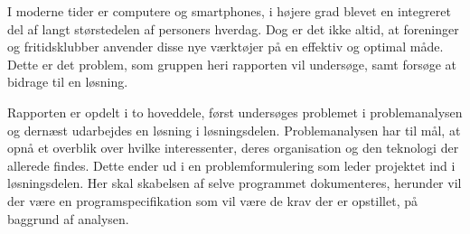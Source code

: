I moderne tider er computere og smartphones, i højere grad blevet en integreret del af langt størstedelen af personers hverdag. 
Dog er det ikke altid, at foreninger og fritidsklubber anvender disse nye værktøjer på en effektiv og optimal måde. 
Dette er det problem, som gruppen heri rapporten vil undersøge, samt forsøge at bidrage til en løsning. 

Rapporten er opdelt i to hoveddele, først undersøges problemet i problemanalysen og dernæst udarbejdes en løsning i løsningsdelen. 
Problemanalysen har til mål, at opnå et overblik over hvilke interessenter, deres organisation og den teknologi der allerede findes. 
Dette ender ud i en problemformulering som leder projektet ind i løsningsdelen. 
Her skal skabelsen af selve programmet dokumenteres, herunder vil der være en programspecifikation som vil være de krav der er opstillet, på baggrund af analysen. 
